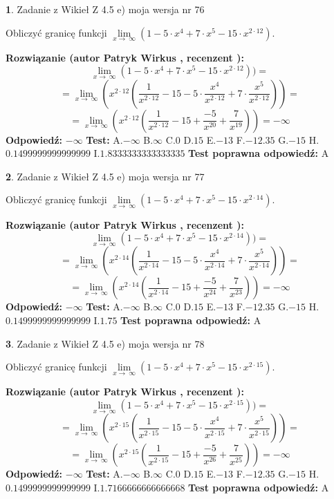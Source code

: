 \documentclass[12pt, a4paper]{article}
\theoremstyle{definition} %
\newtheorem{zad}{}
\newcommand{\zadStart}[1]{\begin{zad}#1\newline}
\newcommand{\zadStop}{\end{zad}}
\newcommand{\rozwStart}[2]{\noindent \textbf{Rozwiązanie (autor #1 , recenzent #2): }\newline}
\newcommand{\rozwStop}{\newline}
\newcommand{\odpStart}{\noindent \textbf{Odpowiedź:}\newline}
\newcommand{\odpStop}{\newline}
\newcommand{\testStart}{\noindent \textbf{Test:}\newline}
\newcommand{\testStop}{\newline}
\newcommand{\kluczStart}{\noindent \textbf{Test poprawna odpowiedź:}\newline}
\newcommand{\kluczStop}{\newline}
\begin{document}
\zadStart{Zadanie z Wikieł Z 4.5 e) moja wersja nr 76}


Obliczyć granicę funkcji  $\lim\limits_{x\to\ \infty}(1 - 5 \cdot x^{4}+7 \cdot x^{5}- 15 \cdot x^{2\cdot12})$.
\zadStop
\rozwStart{Patryk Wirkus}{}
$$\lim\limits_{x\to\ \infty}(1 - 5 \cdot x^{4}+7 \cdot x^{5}- 15 \cdot x^{2\cdot12}))=$$
$$=\lim\limits_{x\to\ \infty}(x^{2\cdot12}(\frac{1}{x^{2\cdot12}}-15 -5 \cdot \frac{x^{4}}{x^{2\cdot12}}+7 \cdot \frac{x^{5}}{x^{2\cdot12}}))=$$
$$=\lim\limits_{x\to\ \infty}(x^{2\cdot12}(\frac{1}{x^{2\cdot12}}-15 + \frac{-5}{x^{20}}+ \frac{7}{x^{19}}))=-\infty$$
\rozwStop
\odpStart
$-\infty$
\odpStop
\testStart
A.$-\infty$ B.$\infty$ C.$0$ D.$15$ E.$-13$
F.$-12.35$ G.$-15$
H.$0.1499999999999999$
I.$1.8333333333333335$
\testStop
\kluczStart
A
\kluczStop



\zadStart{Zadanie z Wikieł Z 4.5 e) moja wersja nr 77}


Obliczyć granicę funkcji  $\lim\limits_{x\to\ \infty}(1 - 5 \cdot x^{4}+7 \cdot x^{5}- 15 \cdot x^{2\cdot14})$.
\zadStop
\rozwStart{Patryk Wirkus}{}
$$\lim\limits_{x\to\ \infty}(1 - 5 \cdot x^{4}+7 \cdot x^{5}- 15 \cdot x^{2\cdot14}))=$$
$$=\lim\limits_{x\to\ \infty}(x^{2\cdot14}(\frac{1}{x^{2\cdot14}}-15 -5 \cdot \frac{x^{4}}{x^{2\cdot14}}+7 \cdot \frac{x^{5}}{x^{2\cdot14}}))=$$
$$=\lim\limits_{x\to\ \infty}(x^{2\cdot14}(\frac{1}{x^{2\cdot14}}-15 + \frac{-5}{x^{24}}+ \frac{7}{x^{23}}))=-\infty$$
\rozwStop
\odpStart
$-\infty$
\odpStop
\testStart
A.$-\infty$ B.$\infty$ C.$0$ D.$15$ E.$-13$
F.$-12.35$ G.$-15$
H.$0.1499999999999999$
I.$1.75$
\testStop
\kluczStart
A
\kluczStop



\zadStart{Zadanie z Wikieł Z 4.5 e) moja wersja nr 78}


Obliczyć granicę funkcji  $\lim\limits_{x\to\ \infty}(1 - 5 \cdot x^{4}+7 \cdot x^{5}- 15 \cdot x^{2\cdot15})$.
\zadStop
\rozwStart{Patryk Wirkus}{}
$$\lim\limits_{x\to\ \infty}(1 - 5 \cdot x^{4}+7 \cdot x^{5}- 15 \cdot x^{2\cdot15}))=$$
$$=\lim\limits_{x\to\ \infty}(x^{2\cdot15}(\frac{1}{x^{2\cdot15}}-15 -5 \cdot \frac{x^{4}}{x^{2\cdot15}}+7 \cdot \frac{x^{5}}{x^{2\cdot15}}))=$$
$$=\lim\limits_{x\to\ \infty}(x^{2\cdot15}(\frac{1}{x^{2\cdot15}}-15 + \frac{-5}{x^{26}}+ \frac{7}{x^{25}}))=-\infty$$
\rozwStop
\odpStart
$-\infty$
\odpStop
\testStart
A.$-\infty$ B.$\infty$ C.$0$ D.$15$ E.$-13$
F.$-12.35$ G.$-15$
H.$0.1499999999999999$
I.$1.7166666666666668$
\testStop
\kluczStart
A
\kluczStop
\end{document}
